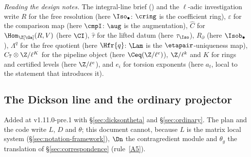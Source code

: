 \noindent\emph{Reading the design notes.} The integral-line brief
() and the $\ell$-adic
investigation write $R$ for the free resolution (here $\Iso_{\bullet}$: $\cring$ is the
coefficient ring), $\varepsilon$ for the comparison map (here $\cmpI$: $\aug$ is the
augmentation), $\widehat C$ for $\Hom_{\Z[\Ga]}(R,V)$ (here $\CI$), $\hat\tau$ for the lifted
datum (here $\tau_{\Iso}$), $R_\partial$ (here $\Isob_{\bullet}$), $\Lambda^{q}$ for the free
quotient (here $\Hfr{q}$: $\Lam$ is the $\etapair$-uniqueness map), $C_7\otimes\Z/\ell^{K}$
for the pipeline object (here $\Ceq(\Z/\ell^{e})$), $\Z/\ell^{k}$ and $K$ for rings and
certified levels (here $\Z/\ell^{e}$), and $e_i$ for torsion exponents (here $a_t$, local to
the statement that introduces it).

\subsection{The Dickson line and the ordinary projector}\label{sec:notation-dickson}

Added at v1.11.0-pre.1 with \S\ref{sec:dicksontheta} and \S\ref{sec:ordinary}. The plan and
the code write $L$, $D$ and $\theta$; this document cannot, because $L$ is the matrix local
system (\S\ref{sec:notation-framework}), $\Dn$ the contragredient module and $\theta_g$ the
translation of \S\ref{sec:correspondence} (rule~\ref{A5}).

